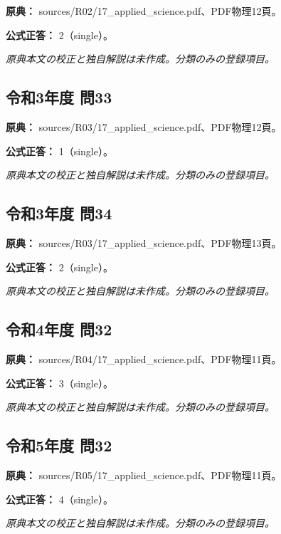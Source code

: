 \noindent\textbf{原典：} sources/R02/17\_applied\_science.pdf、PDF物理12頁。

\textbf{公式正答：} 2（single）。

\par\textit{原典本文の校正と独自解説は未作成。分類のみの登録項目。}

\subsection{令和3年度 問33}
\label{q:r03-reg-applied-33}

\noindent\textbf{原典：} sources/R03/17\_applied\_science.pdf、PDF物理12頁。

\textbf{公式正答：} 1（single）。

\par\textit{原典本文の校正と独自解説は未作成。分類のみの登録項目。}

\subsection{令和3年度 問34}
\label{q:r03-reg-applied-34}

\noindent\textbf{原典：} sources/R03/17\_applied\_science.pdf、PDF物理13頁。

\textbf{公式正答：} 2（single）。

\par\textit{原典本文の校正と独自解説は未作成。分類のみの登録項目。}

\subsection{令和4年度 問32}
\label{q:r04-reg-applied-32}

\noindent\textbf{原典：} sources/R04/17\_applied\_science.pdf、PDF物理11頁。

\textbf{公式正答：} 3（single）。

\par\textit{原典本文の校正と独自解説は未作成。分類のみの登録項目。}

\subsection{令和5年度 問32}
\label{q:r05-reg-applied-32}

\noindent\textbf{原典：} sources/R05/17\_applied\_science.pdf、PDF物理11頁。

\textbf{公式正答：} 4（single）。

\par\textit{原典本文の校正と独自解説は未作成。分類のみの登録項目。}

